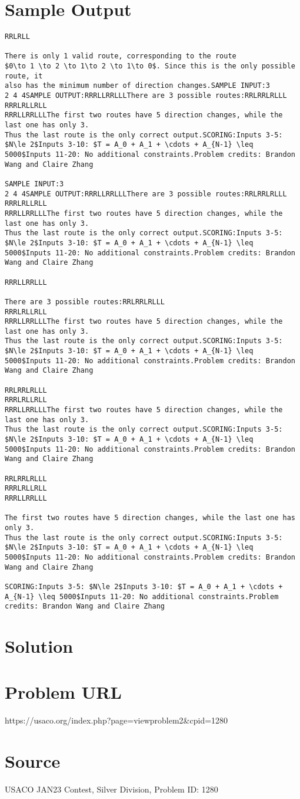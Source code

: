 \documentclass[12pt]{article}
\begin{document}
\section*{Sample Output}
\begin{verbatim}
RRLRLL

There is only 1 valid route, corresponding to the route
$0\to 1 \to 2 \to 1\to 2 \to 1\to 0$. Since this is the only possible route, it
also has the minimum number of direction changes.SAMPLE INPUT:3
2 4 4SAMPLE OUTPUT:RRRLLRRLLLThere are 3 possible routes:RRLRRLRLLL
RRRLRLLRLL
RRRLLRRLLLThe first two routes have 5 direction changes, while the last one has only 3. 
Thus the last route is the only correct output.SCORING:Inputs 3-5: $N\le 2$Inputs 3-10: $T = A_0 + A_1 + \cdots + A_{N-1} \leq 5000$Inputs 11-20: No additional constraints.Problem credits: Brandon Wang and Claire Zhang

SAMPLE INPUT:3
2 4 4SAMPLE OUTPUT:RRRLLRRLLLThere are 3 possible routes:RRLRRLRLLL
RRRLRLLRLL
RRRLLRRLLLThe first two routes have 5 direction changes, while the last one has only 3. 
Thus the last route is the only correct output.SCORING:Inputs 3-5: $N\le 2$Inputs 3-10: $T = A_0 + A_1 + \cdots + A_{N-1} \leq 5000$Inputs 11-20: No additional constraints.Problem credits: Brandon Wang and Claire Zhang

RRRLLRRLLL

There are 3 possible routes:RRLRRLRLLL
RRRLRLLRLL
RRRLLRRLLLThe first two routes have 5 direction changes, while the last one has only 3. 
Thus the last route is the only correct output.SCORING:Inputs 3-5: $N\le 2$Inputs 3-10: $T = A_0 + A_1 + \cdots + A_{N-1} \leq 5000$Inputs 11-20: No additional constraints.Problem credits: Brandon Wang and Claire Zhang

RRLRRLRLLL
RRRLRLLRLL
RRRLLRRLLLThe first two routes have 5 direction changes, while the last one has only 3. 
Thus the last route is the only correct output.SCORING:Inputs 3-5: $N\le 2$Inputs 3-10: $T = A_0 + A_1 + \cdots + A_{N-1} \leq 5000$Inputs 11-20: No additional constraints.Problem credits: Brandon Wang and Claire Zhang

RRLRRLRLLL
RRRLRLLRLL
RRRLLRRLLL

The first two routes have 5 direction changes, while the last one has only 3. 
Thus the last route is the only correct output.SCORING:Inputs 3-5: $N\le 2$Inputs 3-10: $T = A_0 + A_1 + \cdots + A_{N-1} \leq 5000$Inputs 11-20: No additional constraints.Problem credits: Brandon Wang and Claire Zhang

SCORING:Inputs 3-5: $N\le 2$Inputs 3-10: $T = A_0 + A_1 + \cdots + A_{N-1} \leq 5000$Inputs 11-20: No additional constraints.Problem credits: Brandon Wang and Claire Zhang
\end{verbatim}

\section*{Solution}


\section*{Problem URL}
https://usaco.org/index.php?page=viewproblem2&cpid=1280

\section*{Source}
USACO JAN23 Contest, Silver Division, Problem ID: 1280
\end{document}
